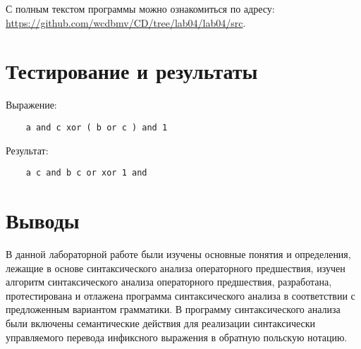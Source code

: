 \documentclass{bmstu-gost-7-32}
\begin{document}
С полным текстом программы можно ознакомиться по адресу: \url{https://github.com/wcdbmv/CD/tree/lab04/lab04/src}.

\section*{Тестирование и результаты}

Выражение:
\begin{verbatim}
	a and c xor ( b or c ) and 1
\end{verbatim}

Результат:
\begin{verbatim}
	a c and b c or xor 1 and
\end{verbatim}

\section*{Выводы}

В данной лабораторной работе были изучены основные понятия и определения, лежащие в основе синтаксического анализа операторного предшествия, изучен алгоритм синтаксического анализа операторного предшествия, разработана, протестирована и отлажена программа синтаксического анализа в соответствии с предложенным вариантом грамматики.
В программу синтаксического анализа были включены семантические действия для реализации синтаксически управляемого перевода инфиксного выражения в обратную польскую нотацию.
\end{document}
